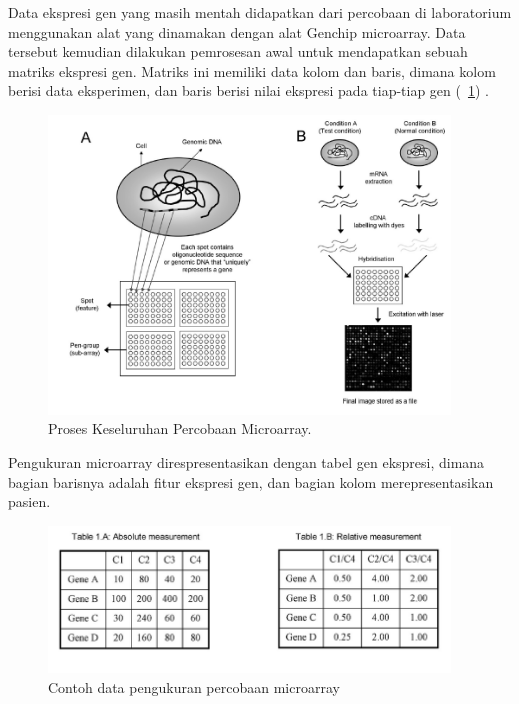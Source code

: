 Data ekspresi gen yang masih mentah didapatkan dari percobaan di laboratorium menggunakan alat yang dinamakan dengan alat Genchip microarray. Data tersebut kemudian dilakukan pemrosesan awal untuk mendapatkan sebuah matriks ekspresi gen. Matriks ini memiliki data kolom dan baris, dimana kolom berisi data eksperimen, dan baris berisi nilai ekspresi pada tiap-tiap gen (\pic~\ref{fig:gbr2.2}) \citep{babu2004introduction}.

\begin{figure}
	\centering
	\includegraphics[width=0.95\textwidth]
		{pics/gbr2_2.png}
	\caption{Proses Keseluruhan Percobaan Microarray.\citep{yoon2006building}}
	\label{fig:gbr2.2}
\end{figure}

Pengukuran microarray direspresentasikan dengan tabel gen ekspresi, dimana bagian barisnya adalah fitur ekspresi gen, dan bagian kolom merepresentasikan pasien.

\begin{figure}
	\centering
	\includegraphics[width=0.95\textwidth]
		{pics/msr.png}
	\caption{Contoh data pengukuran percobaan microarray \citep{yoon2006building}}
	\label{fig:msr}
\end{figure}


